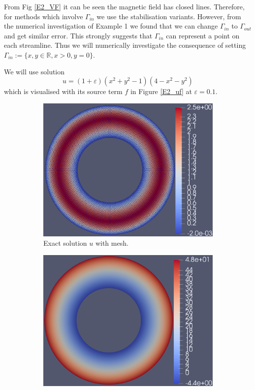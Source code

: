 \documentclass[12pt]{ociamthesis}
\begin{document}
From Fig \ref{E2_VF} it can be seen the magnetic field has closed lines. Therefore, for methods which involve $\Gamma_{in}$ we use the stabilisation variants. However, from the numerical investigation of Example 1 we found that we can change $\Gamma_{in}$ to $\Gamma_{out}$ and get similar error. This strongly suggests that $\Gamma_{in}$ can represent a point on each streamline. Thus we will numerically investigate the consequence of setting $\Gamma_{in}:=\{x,y \in \mathbb{R}, x>0, y=0\}$.

We will use solution
\begin{equation}
u = (1+\varepsilon)(x^2 + y^2 -1)(4-x^2-y^2)
\end{equation}
which is visualised with its source term $f$ in Figure \ref{E2_uf} at $\varepsilon = 0.1$.
\begin{figure}[H]
 \begin{subfigure}{0.5\textwidth}
     \includegraphics[width=\textwidth]{Pics/uf/U_E2_eps_1.png}
     \caption{Exact solution $u$ with mesh.}
 \end{subfigure}
   \begin{subfigure}{0.5\textwidth}
     \includegraphics[width=\textwidth]{Pics/uf/F_E2_eps_1.png}

\end{subfigure}
\end{figure}
\end{document}
